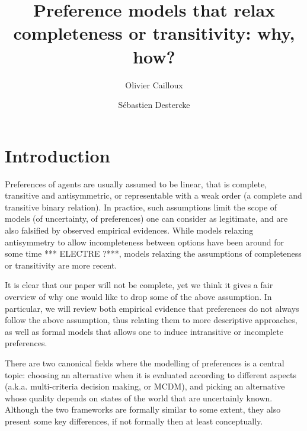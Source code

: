 \documentclass[french, english]{llncs}
\begin{document}
\title{Preference models that relax completeness or transitivity: why, how?}
\author{Olivier Cailloux \and Sébastien Destercke}
\maketitle


\setlength{\parindent}{1.5em}

\section{Introduction}
Preferences of agents are usually assumed to be linear, that is complete, transitive and antisymmetric, or representable with a weak order (a complete and transitive binary relation). In practice, such assumptions limit the scope of models (of uncertainty, of preferences) one can consider as legitimate, and are also falsified by observed empirical evidences. While models relaxing antisymmetry to allow incompleteness between options have been around for some time *** ELECTRE ?***, models relaxing the assumptions of completeness or transitivity are more recent.

It is clear that our paper will not be complete, yet we think it gives a fair overview of why one would like to drop some of the above assumption. In particular, we will review both empirical evidence that preferences do not always follow the above assumption, thus relating them to more descriptive approaches, as well as formal  models that allows one to induce intransitive or incomplete preferences. 

There are two canonical fields where the modelling of preferences is a central topic: choosing an alternative when it is evaluated according to different aspects (a.k.a. multi-criteria decision making, or MCDM), and picking an alternative whose quality depends on states of the world that are uncertainly known. Although the two frameworks are formally similar to some extent, they also present some key differences, if not formally then at least conceptually. 
\end{document}
